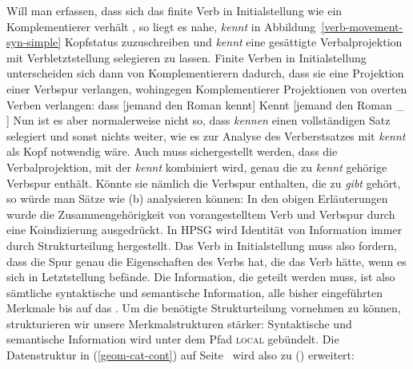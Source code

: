 Will man erfassen, dass sich das finite Verb in Initialstellung wie ein Komplementierer verhält
\citep{HoehleKomplementierer}, so liegt es nahe, \emph{kennt} in
Abbildung~\ref{verb-movement-syn-simple} Kopfstatus zuzuschreiben und \emph{kennt} eine gesättigte
Verbalprojektion mit Verbletztstellung selegieren zu lassen. Finite Verben in Initialstellung
unterscheiden sich dann von Komplementierern dadurch, dass sie eine Projektion einer Verbspur
verlangen, wohingegen Komplementierer Projektionen von overten Verben verlangen:
\eal
\ex dass [jemand den Roman kennt]
\ex Kennt [jemand den Roman \_ ]
\zl
Nun ist es aber normalerweise nicht so, dass \emph{kennen} einen vollständigen Satz selegiert und
sonst nichts weiter, wie es zur Analyse des Verberstsatzes mit \emph{kennt} als Kopf notwendig
wäre. Auch muss sichergestellt werden, dass die Verbalprojektion, mit der \emph{kennt} kombiniert
wird, genau die zu \emph{kennt} gehörige Verbspur enthält. Könnte sie nämlich die Verbspur
enthalten, die zu \emph{gibt} gehört, so würde man Sätze wie (b) analysieren können: 
\eal
{} 
\zl
In den obigen Erläuterungen wurde die Zusammengehörigkeit von vorangestelltem Verb und Verbspur
durch eine Koindizierung ausgedrückt. In HPSG wird Identität von Information immer durch Strukturteilung
hergestellt. Das Verb in Initialstellung muss also fordern, dass die Spur genau die Eigenschaften des
Verbs hat, die das Verb hätte, wenn es sich in Letztstellung befände. Die Information, die geteilt
werden muss, ist also sämtliche syntaktische und semantische Information, \dash alle bisher eingeführten
Merkmale bis auf das \phonm. Um die benötigte Strukturteilung vornehmen zu können, strukturieren
wir unsere Merkmalstrukturen stärker: Syntaktische und semantische Information wird unter dem
Pfad \textsc{local} gebündelt. Die Datenstruktur in (\ref{geom-cat-cont}) auf Seite~\pageref{geom-cat-cont}
wird also zu () erweitert:
\ea
\label{geom-loc}
\z

